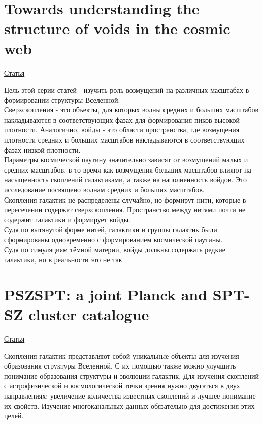 \documentclass{article}
\begin{document}
\section{Towards understanding the structure of voids in the cosmic web}
\hyperlink{https://www.aanda.org/articles/aa/pdf/2011/10/aa17248-11.pdf}{Статья}

Цель этой серии статей - изучить роль возмущений на различных масштабах в формировании структуры 
Вселенной.\\

Сверхскопления - это объекты, для которых волны средних и больших масштабов накладываются в 
соответствующих фазах для формирования пиков высокой плотности. Аналогично, войды - это области 
пространства, где возмущения плотности средних и больших масштабов накладываются в соответствующих 
фазах низкой плотности.\\

Параметры космической паутину значительно зависят от возмущений малых и средних масштабов, в то время 
как возмущения больших масштабов влияют на насыщенность скоплений галактиками, а также на наполненность
войдов. Это исследование посвящено волнам средних и больших масштабов.\\

Скопления галактик не распределены случайно, но формирут нити, которые в пересечении содержат 
сверхскопления. Пространство между нитями почти не содержит галактики и формирует войды.\\

Судя по вытянутой форме нитей, галактики и группы галактик были сформированы одновременно с 
формированием космической паутины.\\

Судя по симуляциям тёмной материи, войды должны содержать редкие галактики, но в реальности это не 
так.\\

\section{PSZSPT: a joint Planck and SPT-SZ cluster catalogue}
\hyperlink{https://arxiv.org/pdf/2009.08822.pdf}{Статья}

Скопления галактик представляют собой уникальные объекты для изучения образования структуры 
Вселенной. С их помощью также можно улучшить понимание образования структуры и эволюции галактик. 
Для изучения скоплений с астрофизической и космологической точки зрения нужно двугаться в двух 
направлениях: увеличение количества известных скоплений и лучшее понимание их свойств. Изучение 
многоканальных данных обязательно для достижения этих целей.\\
\end{document}
